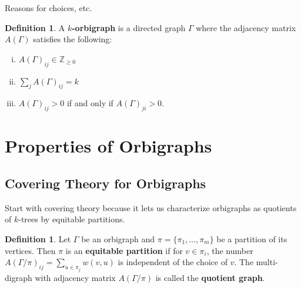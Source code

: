 \documentclass[12pt]{article}
\theoremstyle{plain}
\theoremstyle{definition}
\newtheorem{definition}[theorem]{Definition}
\theoremstyle{remark}
\begin{document}
  Reasons for choices, etc.

  \begin{definition}\label{def:OrbigraphDefn}
    A \textbf{$k$-orbigraph} is a directed graph $\Gamma$ where the adjacency matrix $A(\Gamma)$ satisfies the following:
    
    \begin{enumerate}[(i)]
      \item $A(\Gamma)_{ij} \in \mathbb{Z}_{\ge 0}$
      \item $\sum_j A(\Gamma)_{ij} = k$
      \item $A(\Gamma)_{ij} > 0$ if and only if $A(\Gamma)_{ji} > 0$.
    \end{enumerate}

  \end{definition}


\section{Properties of Orbigraphs}


  \subsection{Covering Theory for Orbigraphs}

    Start with covering theory because it lets us characterize orbigraphs as quotients of $k$-trees by equitable partitions.

    \begin{definition}\label{def:EqPartitionDefn}
      Let $\Gamma$ be an orbigraph and $\pi = \{ \pi_1, \ldots, \pi_m \}$ be a partition of its vertices. Then $\pi$ is an \textbf{equitable partition} if for $v \in \pi_i$, the number $A(\Gamma / \pi)_{ij} = \sum_{u \in \pi_j} w(v, u)$ is independent of the choice of $v$. The multi-digraph with adjacency matrix $A(\Gamma / \pi)$ is called the \textbf{quotient graph}.
    \end{definition}
\end{document}
